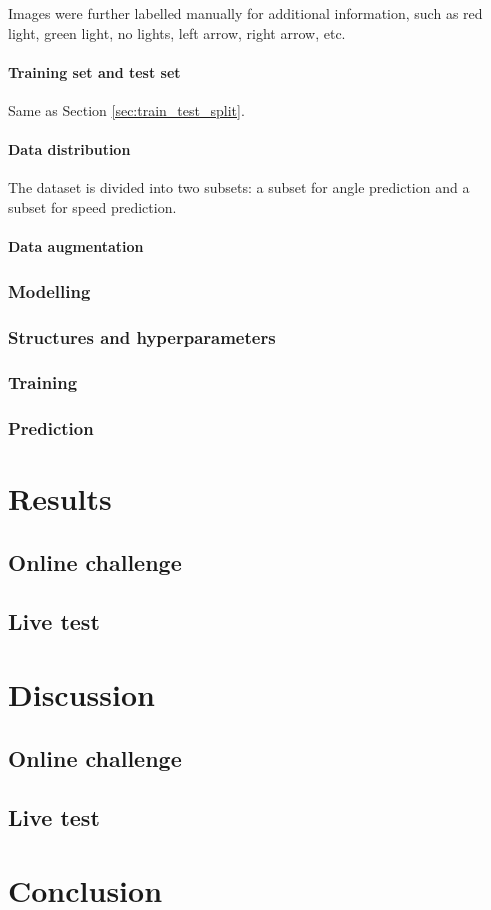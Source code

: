 \documentclass{article}
\begin{document}
Images were further labelled manually for additional information, such as red light, green light, no lights, left arrow, right arrow, etc. 

\paragraph{Training set and test set}
Same as Section \ref{sec:train_test_split}.

\paragraph{Data distribution}
The dataset is divided into two subsets: a subset for angle prediction and a subset for speed prediction. 

\paragraph{Data augmentation}

\subsubsection{Modelling}

\subsubsection{Structures and hyperparameters}

\subsubsection{Training}

\subsubsection{Prediction}

\section{Results}

\subsection{Online challenge}

\subsection{Live test}



\section{Discussion}

\subsection{Online challenge}

\subsection{Live test}

\section{Conclusion}


\end{document}
